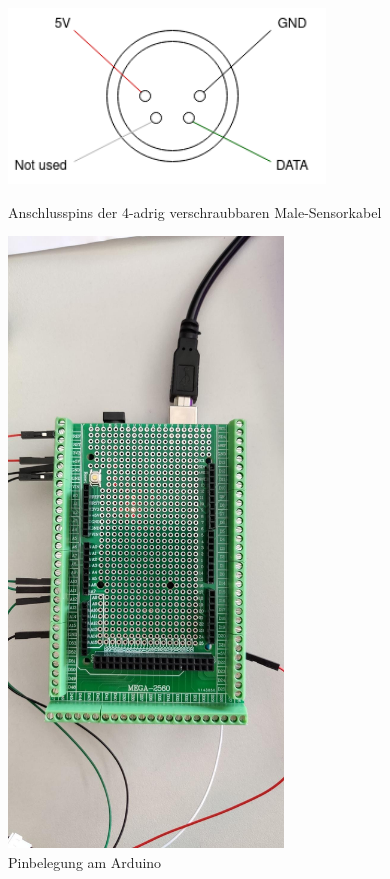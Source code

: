 \begin{figure}[htpb]
  \begin{minipage}{.5\textwidth}
    \centering
    \includegraphics[width=0.75\textwidth]{./pics/Sensoranschluesse.png}
    \caption{Anschlusspins der 4-adrig verschraubbaren Male-Sensorkabel}
    \label{appendix:doku:fig:sensorkabel}
  \end{minipage}%
  \begin{minipage}{.5\textwidth}
    \centering
    \includegraphics[trim={0 5cm 0 10cm}, clip, width=0.65\textwidth]{./pics/Arduino.jpeg}
    \caption{Pinbelegung am Arduino}
    \label{appendix:doku:fig:arduino}
  \end{minipage}
\end{figure}


